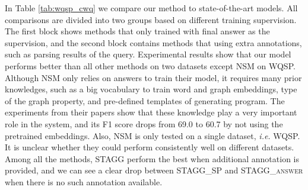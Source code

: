  In Table \ref{tab:wqsp_cwq} we compare our method to state-of-the-art models. All comparisons are divided into two groups based on different training supervision. The first block shows methods that only trained with final answer as the supervision, and the second block contains methods that using extra annotations, such as parsing results of the query. Experimental results show that our model performs better than all other methods on two datasets except NSM \cite{DBLP:conf/acl/LiangBLFL17} on WQSP. Although NSM only relies on answers to train their model, it requires many prior knowledges, such as a big vocabulary to train word and graph embeddings, type of the graph property, and pre-defined templates of generating program. The experiments from their papers show that these knowledge play a very important role in the system, and its F1 score drops from 69.0 to 60.7 by not using the pretrained embeddings. %
 Also, NSM is only tested on a single dataset, \emph{i.e.} WQSP. It is unclear whether they could perform consistently well on different datasets. Among all the methods, \textsc{STAGG} perform the best when additional annotation is provided, and we can see a clear drop between \textsc{STAGG\_SP} and \textsc{STAGG\_answer} when there is no such annotation available.



